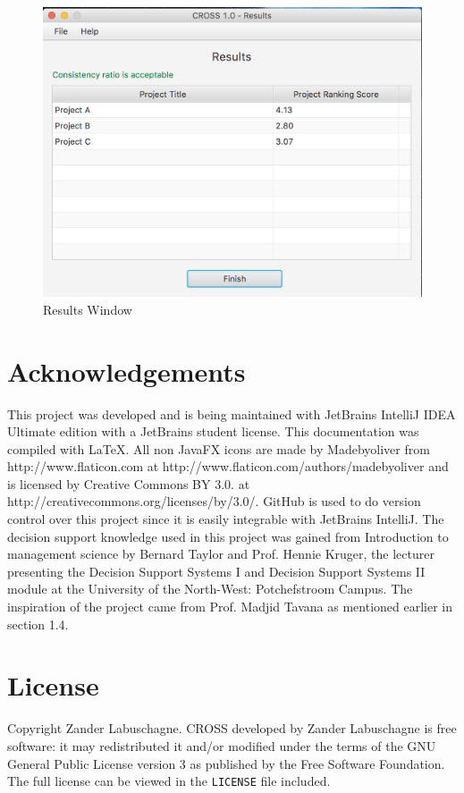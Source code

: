 \documentclass[11pt]{article}
\newcommand{\code}[1]{\texttt{#1}}
\begin{document}
		\begin{figure}[!htb]
			\centering
			\includegraphics[scale=0.55]{results}
			\caption{Results Window} %
			\label{fig:results} %
		\end{figure}
		
	\newpage
		

	\section{Acknowledgements}
		This project was developed and is being maintained with JetBrains IntelliJ IDEA Ultimate edition with a JetBrains student license. This documentation was compiled with \LaTeX. All non JavaFX icons are made by Madebyoliver from http://www.flaticon.com at http://www.flaticon.com/authors/madebyoliver and is licensed by Creative Commons BY 3.0. at http://creativecommons.org/licenses/by/3.0/. GitHub is used to do version control over this project since it is easily integrable with JetBrains IntelliJ. The decision support knowledge used in this project was gained from Introduction to management science by Bernard Taylor \cite{taylor2004introduction} and Prof. Hennie Kruger, the lecturer presenting the Decision Support Systems I and Decision Support Systems II module at the University of the North-West: Potchefstroom Campus. The inspiration of the project came from Prof. Madjid Tavana as mentioned earlier in section 1.4.

	\section{License}
		Copyright \textcopyright {} Zander Labuschagne. CROSS developed by Zander Labuschagne is free software: it may redistributed it and/or modified under the terms of the GNU General Public License version 3 as published by the Free Software Foundation. The full license can be viewed in the \code{LICENSE} file included.
\end{document}
